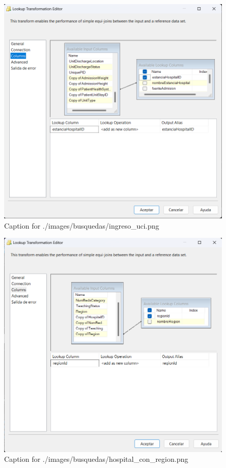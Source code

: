 \documentclass{article}
\begin{document}
\begin{figure}[H]
  \centering
  \includegraphics[width=\linewidth]{./images/busquedas/ingreso_uci.png}
  \caption{Caption for ./images/busquedas/ingreso_uci.png}
\end{figure}
\begin{figure}[H]
  \centering
  \includegraphics[width=\linewidth]{./images/busquedas/hospital_con_region.png}
  \caption{Caption for ./images/busquedas/hospital_con_region.png}
\end{figure}
\end{document}
